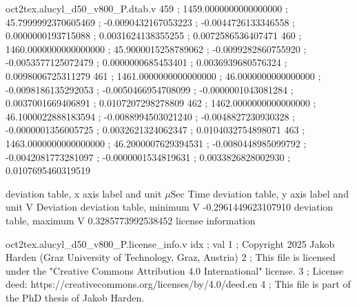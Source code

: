 \begin{filecontents}[overwrite]{oct2tex.alucyl_d50_v800_P.dtab.v}
459 ; 1459.0000000000000000 ; 45.7999992370605469 ; -0.0090432167053223 ; -0.0044726133346558 ; 0.0000000193715088 ; 0.0031624138355255 ; 0.0072586536407471
460 ; 1460.0000000000000000 ; 45.9000015258789062 ; -0.0099282860755920 ; -0.0053577125072479 ; 0.0000000685453401 ; 0.0036939680576324 ; 0.0098006725311279
461 ; 1461.0000000000000000 ; 46.0000000000000000 ; -0.0098186135292053 ; -0.0050466954708099 ; -0.0000001043081284 ; 0.0037001669406891 ; 0.0107207298278809
462 ; 1462.0000000000000000 ; 46.1000022888183594 ; -0.0088994503021240 ; -0.0048827230930328 ; -0.0000001356005725 ; 0.0032621324062347 ; 0.0104032754898071
463 ; 1463.0000000000000000 ; 46.2000007629394531 ; -0.0080448985099792 ; -0.0042081773281097 ; -0.0000001534819631 ; 0.0033826828002930 ; 0.0107695460319519
\end{filecontents}
\expandafter\def\csname oct2tex.alucyl_d50_v800_P.dtabxlbl.d\endcsname{deviation table, x axis label and unit}
\expandafter\def\csname oct2tex.alucyl_d50_v800_P.dtabxlbl.u\endcsname{\ensuremath{\mu\text{Sec}}}
\expandafter\def\csname oct2tex.alucyl_d50_v800_P.dtabxlbl.v\endcsname{Time}
\expandafter\def\csname oct2tex.alucyl_d50_v800_P.dtabylbl.d\endcsname{deviation table, y axis label and unit}
\expandafter\def\csname oct2tex.alucyl_d50_v800_P.dtabylbl.u\endcsname{\ensuremath{\text{V}}}
\expandafter\def\csname oct2tex.alucyl_d50_v800_P.dtabylbl.v\endcsname{Deviation}
\expandafter\def\csname oct2tex.alucyl_d50_v800_P.dtabmin.d\endcsname{deviation table, minimum}
\expandafter\def\csname oct2tex.alucyl_d50_v800_P.dtabmin.u\endcsname{\ensuremath{\text{V}}}
\expandafter\def\csname oct2tex.alucyl_d50_v800_P.dtabmin.v\endcsname{-0.2961449623107910}
\expandafter\def\csname oct2tex.alucyl_d50_v800_P.dtabmax.d\endcsname{deviation table, maximum}
\expandafter\def\csname oct2tex.alucyl_d50_v800_P.dtabmax.u\endcsname{\ensuremath{\text{V}}}
\expandafter\def\csname oct2tex.alucyl_d50_v800_P.dtabmax.v\endcsname{0.3285773992538452}
\expandafter\def\csname oct2tex.alucyl_d50_v800_P.license_info.d\endcsname{license information}
\begin{filecontents}[overwrite]{oct2tex.alucyl_d50_v800_P.license_info.v}
idx ; val
1 ; Copyright 2025 Jakob Harden (Graz University of Technology, Graz, Austria)
2 ; This file is licensed under the "Creative Commons Attribution 4.0 International" license.
3 ; License deed: https://creativecommons.org/licenses/by/4.0/deed.en
4 ; This file is part of the PhD thesis of Jakob Harden.
\end{filecontents}

